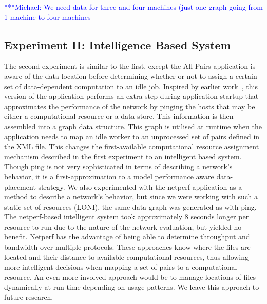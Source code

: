 \documentclass{rspublic}
\newcommand{\micnote}[1]{ {\textcolor{blue} { ***Michael: #1 }}}
\newcommand{\betynote}[1]{ {\textcolor{orange} { ***Bety: #1 }}}
\newcommand{\jhanote}[1]{} \newcommand{\micnote}[1]{}\newcommand{\betynote}[1]{} \newcommand{\fixme}[1]{}
\begin{document}

\micnote{We need data for three and four
machines (just one graph going from 1 machine to four machines}

\subsection{Experiment II: Intelligence Based System}
The second experiment is similar to the first, except the All-Pairs
application is aware of the data location before determining whether or
not to assign a certain set of data-dependent computation to an idle
job. Inspired by earlier work~\citep{netperf}, this version of the
application performs an extra step during application startup that
approximates the performance of the network by pinging the hosts that
may be either a computational resource or a data store. This information
is then assembled into a graph data structure. This graph is utilised at
runtime when the application needs to map an idle worker to an
unprocessed set of pairs defined in the XML file. This changes the
first-available computational resource assignment mechanism described in
the first experiment to an intelligent based system. Though ping is not
very sophisticated in terms of describing a network's behavior, it is a
first-approximation to a model performance aware data-placement
strategy. We also experimented with the netperf application
\citep{netperf_web} as a method to describe a network's behavior, but
since we were working with such a static set of resources (LONI), the
same data graph was generated as with ping. The netperf-based
intelligent system took approximately 8 seconds longer per resource to
run due to the nature of the network evaluation, but yielded no benefit.
Netperf has the advantage of being able to determine throughput and
bandwidth over multiple protocols. These approaches know where the files
are located and their distance to available computational resources,
thus allowing more intelligent decisions when mapping a set of pairs to
a computational resource. An even more involved approach would be to
manage locations of files dynamically at run-time depending on usage
patterns. We leave this approach to future research. 
\end{document}
